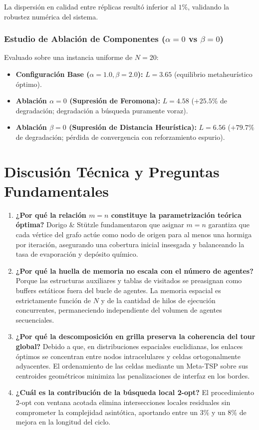 \documentclass[11pt,a4paper]{article}
\begin{document}
La dispersión en calidad entre réplicas resultó inferior al $1\%$, validando la robustez numérica del sistema.

\subsubsection{Estudio de Ablación de Componentes (\texorpdfstring{$\alpha = 0$ vs $\beta = 0$}{alpha = 0 vs beta = 0})}
Evaluado sobre una instancia uniforme de $N = 20$:
\begin{itemize}
    \item \textbf{Configuración Base ($\alpha=1.0, \beta=2.0$):} $L = \mathbf{3.65}$ (equilibrio metaheurístico óptimo).
    \item \textbf{Ablación $\alpha = 0$ (Supresión de Feromona):} $L = \mathbf{4.58}$ ($+25.5\%$ de degradación; degradación a búsqueda puramente voraz).
    \item \textbf{Ablación $\beta = 0$ (Supresión de Distancia Heurística):} $L = \mathbf{6.56}$ ($+79.7\%$ de degradación; pérdida de convergencia con reforzamiento espurio).
\end{itemize}

\section{Discusión Técnica y Preguntas Fundamentales}

\begin{enumerate}
    \item \textbf{¿Por qué la relación $m=n$ constituye la parametrización teórica óptima?}
    Dorigo \& Stützle fundamentaron que asignar $m = n$ garantiza que cada vértice del grafo actúe como nodo de origen para al menos una hormiga por iteración, asegurando una cobertura inicial insesgada y balanceando la tasa de evaporación y depósito químico.
    \item \textbf{¿Por qué la huella de memoria no escala con el número de agentes?}
    Porque las estructuras auxiliares y tablas de visitados se preasignan como buffers estáticos fuera del bucle de agentes. La memoria espacial es estrictamente función de $N$ y de la cantidad de hilos de ejecución concurrentes, permaneciendo independiente del volumen de agentes secuenciales.
    \item \textbf{¿Por qué la descomposición en grilla preserva la coherencia del tour global?}
    Debido a que, en distribuciones espaciales euclidianas, los enlaces óptimos se concentran entre nodos intracelulares y celdas ortogonalmente adyacentes. El ordenamiento de las celdas mediante un Meta-TSP sobre sus centroides geométricos minimiza las penalizaciones de interfaz en los bordes.
    \item \textbf{¿Cuál es la contribución de la búsqueda local 2-opt?}
    El procedimiento 2-opt con ventana acotada elimina intersecciones locales residuales sin comprometer la complejidad asintótica, aportando entre un $3\%$ y un $8\%$ de mejora en la longitud del ciclo.
\end{enumerate}
\end{document}
